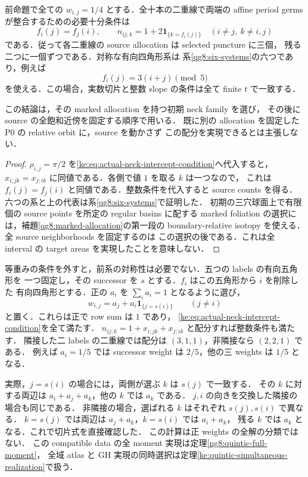 \begin{corollary}
\label{ke:k4-equal-weight-periods}
前命題で全ての $w_{i,j}=1/4$ とする．全十本の二重線で両端の affine
period germs が整合するための必要十分条件は
\[
 f_i(j)=f_j(i),\qquad
 n_{ij;k}=1+2\mathbf1_{\{k=f_i(j)\}}
 \quad(i\ne j,\ k\ne i,j)
\]
である．従って各二重線の source allocation は selected puncture に三個，
残る二つに一個ずつである．対称な有向四角形系は
系\ref{qg8:six-systems}の六つであり，例えば
\[
 f_i(j)=3(i+j)\pmod5
\]
を使える．この場合，実数切片と整数 slope の条件は全て finite $t$ で一致する．

この結論は，その marked allocation を持つ初期 neck family を選び，
その後に source の全飽和近傍を固定する順序で用いる．
既に別の allocation を固定した P0 の relative orbit に，source を動かさず
この配分を実現できるとは主張しない．
\end{corollary}

\begin{proof}
$\rho_{i,j}=\pi/2$ を\eqref{ke:eq:actual-neck-intercept-condition}へ代入すると，
$x_{i;jk}=x_{j;ik}$ に同値である．各側で値 $1$ を取る $k$ は一つなので，
これは $f_i(j)=f_j(i)$ と同値である．整数条件を代入すると source counts を得る．
六つの系と上の代表は系\ref{qg8:six-systems}で証明した．
初期の三穴球面上で有限個の source points を所定の regular basins に配する
marked foliation の選択には，補題\ref{qg8:marked-allocation}の第一段の
boundary-relative isotopy を使える．全 source neighborhoods を固定するのは
この選択の後である．これは全 interval の target areas を実現したことを意味しない．
\end{proof}

\begin{example}
\label{ke:k4-cyclic-weight-periods}
等重みの条件を外すと，前系の対称性は必要でない．五つの labels の有向五角形を
一つ固定し，その successor を $s$ とする．$f_i$ はこの五角形から $i$ を削除した
有向四角形とする．正の $a_i$ を $\sum_i a_i=1$ となるように選び，
\[
 w_{i,j}=a_j+a_i\mathbf1_{\{j=s(i)\}}
 \qquad(j\ne i)
\]
と置く．これらは正で row sum は $1$ であり，
\eqref{ke:eq:actual-neck-intercept-condition}を全て満たす．
$n_{ij;k}=1+x_{i;jk}+x_{j;ik}$ と配分すれば整数条件も満たす．
隣接した二 labels の二重線では配分は $(3,1,1)$，非隣接なら $(2,2,1)$ である．
例えば $a_i=1/5$ では successor weight は $2/5$，他の三 weights は $1/5$ となる．

実際，$j=s(i)$ の場合には，両側が選ぶ $k$ は $s(j)$ で一致する．
その $k$ に対する両辺は $a_i+a_j+a_k$，他の $k$ では $a_k$ である．
$j,i$ の向きを交換した隣接の場合も同じである．
非隣接の場合，選ばれる $k$ はそれぞれ $s(j),s(i)$ で異なる．
$k=s(j)$ では両辺は $a_j+a_k$，$k=s(i)$ では $a_i+a_k$，
残る $k$ では $a_k$ となる．これで切片式を直接確認した．
この計算は正 weights の全解の分類ではない．
この compatible data の全 moment 実現は定理\ref{ng8:quintic-full-moment}，
全域 atlas と GH 実現の同時選択は定理\ref{ke:quintic-simultaneous-realization}で扱う．
\end{example}

